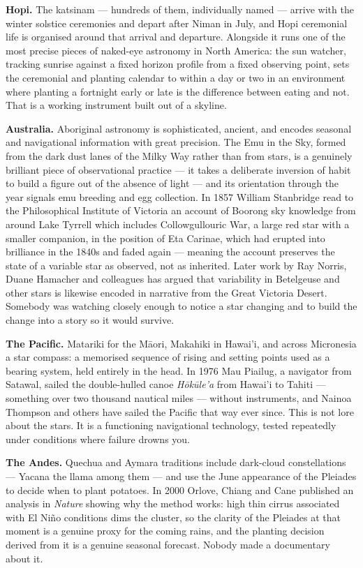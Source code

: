 \textbf{Hopi.} The katsinam --- hundreds of them, individually named --- arrive with the winter
solstice ceremonies and depart after Niman in July, and Hopi ceremonial life is organised around
that arrival and departure. Alongside it runs one of the most precise pieces of naked-eye
astronomy in North America: the sun watcher, tracking sunrise against a fixed horizon profile
from a fixed observing point, sets the ceremonial and planting calendar to within a day or two
in an environment where planting a fortnight early or late is the difference between eating and
not. That is a working instrument built out of a skyline.

\textbf{Australia.} Aboriginal astronomy is sophisticated, ancient, and encodes seasonal and
navigational information with great precision. The Emu in the Sky, formed from the dark dust
lanes of the Milky Way rather than from stars, is a genuinely brilliant piece of observational
practice --- it takes a deliberate inversion of habit to build a figure out of the absence of
light --- and its orientation through the year signals emu breeding and egg collection. In 1857
William Stanbridge read to the Philosophical Institute of Victoria an account of Boorong sky
knowledge from around Lake Tyrrell which includes Collowgullouric War, a large red star with a
smaller companion, in the position of Eta Carinae, which had erupted into brilliance in the
1840s and faded again --- meaning the account preserves the state of a variable star as observed,
not as inherited. Later work by Ray Norris, Duane Hamacher and colleagues has argued that
variability in Betelgeuse and other stars is likewise encoded in narrative from the Great
Victoria Desert. Somebody was watching closely enough to notice a star changing and to build the
change into a story so it would survive.

\textbf{The Pacific.} Matariki for the M\=aori, Makahiki in Hawai'i, and across Micronesia a star
compass: a memorised sequence of rising and setting points used as a bearing system, held
entirely in the head. In 1976 Mau Piailug, a navigator from Satawal, sailed the double-hulled
canoe \emph{H\=ok\=ule'a} from Hawai'i to Tahiti --- something over two thousand nautical miles ---
without instruments, and Nainoa Thompson and others have sailed the Pacific that way ever since.
This is not lore about the stars. It is a functioning navigational technology, tested repeatedly
under conditions where failure drowns you.

\textbf{The Andes.} Quechua and Aymara traditions include dark-cloud constellations --- Yacana
the llama among them --- and use the June appearance of the Pleiades to decide when to plant
potatoes. In 2000 Orlove, Chiang and Cane published an analysis in \emph{Nature} showing why the
method works: high thin cirrus associated with El Ni\~no conditions dims the cluster, so the
clarity of the Pleiades at that moment is a genuine proxy for the coming rains, and the planting
decision derived from it is a genuine seasonal forecast.  Nobody made a documentary
about it.

